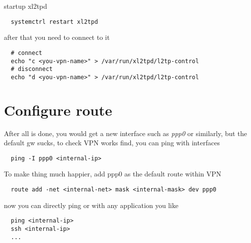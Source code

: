 startup xl2tpd
\begin{lstlisting}
  systemctrl restart xl2tpd
\end{lstlisting}

after that you need to connect to it
\begin{lstlisting}
  # connect
  echo "c <you-vpn-name>" > /var/run/xl2tpd/l2tp-control
  # disconnect
  echo "d <you-vpn-name>" > /var/run/xl2tpd/l2tp-control   
\end{lstlisting}


\section{Configure route}

After all is done, you would get a new interface such as \emph{ppp0} or similarly, but the default gw sucks, to check VPN works find, you can ping with interfaces
\begin{lstlisting}
  ping -I ppp0 <internal-ip>
\end{lstlisting}



To make thing much happier, add ppp0 as the default route within VPN
\begin{lstlisting}
  route add -net <internal-net> mask <internal-mask> dev ppp0 
\end{lstlisting}

now you can directly ping or with any application you like
\begin{lstlisting}
  ping <internal-ip>
  ssh <internal-ip>
  ...
\end{lstlisting}








